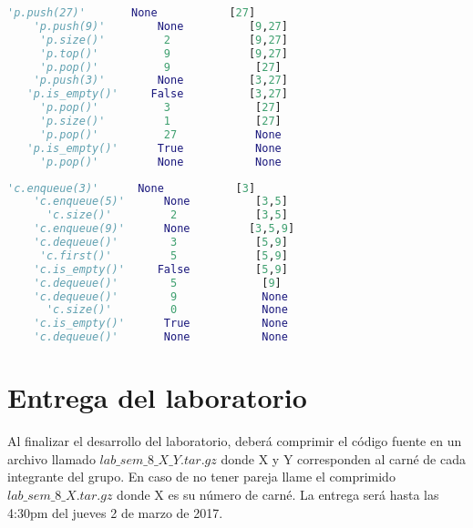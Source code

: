 \documentclass[11pt, letterpaper]{article}
\begin{document}
\begin{center}
\begin{lstlisting}[language=Python,frame=single]
    'p.push(27)'       None           [27]     
    'p.push(9)'        None          [9,27]    
     'p.size()'         2            [9,27]    
     'p.top()'          9            [9,27]    
     'p.pop()'          9             [27]     
    'p.push(3)'        None          [3,27]    
   'p.is_empty()'     False          [3,27]    
     'p.pop()'          3             [27]     
     'p.size()'         1             [27]     
     'p.pop()'          27            None     
   'p.is_empty()'      True           None     
     'p.pop()'         None           None 
\end{lstlisting}
\end{center}

\begin{center}
\begin{lstlisting}[language=Python,frame=single]
    'c.enqueue(3)'      None           [3]
    'c.enqueue(5)'      None          [3,5]
      'c.size()'         2            [3,5]
    'c.enqueue(9)'      None         [3,5,9]
    'c.dequeue()'        3            [5,9]
     'c.first()'         5            [5,9]
    'c.is_empty()'     False          [5,9]
    'c.dequeue()'        5             [9]
    'c.dequeue()'        9             None
      'c.size()'         0             None
    'c.is_empty()'      True           None
    'c.dequeue()'       None           None
\end{lstlisting}
\end{center}

\section*{Entrega del laboratorio}

Al finalizar el desarrollo del laboratorio, deberá comprimir el código fuente en un archivo llamado $lab\_sem\_8\_X\_Y.tar.gz$ donde X y Y corresponden al carné de cada integrante del grupo. En caso de no tener pareja llame el comprimido $lab\_sem\_8\_X.tar.gz$ donde X es su número de carné. La entrega será hasta las 4:30pm del jueves 2 de marzo de 2017.
\end{document}
